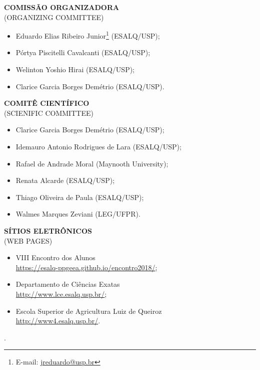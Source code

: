 \documentclass[12pt, twoside, a4paper]{article}
\newcommand{\blankpage}{
  \begin{titlepage}\centering . \end{titlepage}
}
\begin{document}
\begin{titlepage}
  \noindent
  \textbf{COMISSÃO ORGANIZADORA}\\
  (ORGANIZING COMMITTEE)
  \begin{itemize}
    \item Eduardo Elias Ribeiro Junior\footnote{E-mail:
        \url{jreduardo@usp.br}} (ESALQ/USP);
    \item Pórtya Piscitelli Cavalcanti (ESALQ/USP);
    \item Welinton Yoshio Hirai (ESALQ/USP);
    \item Clarice Garcia Borges Demétrio (ESALQ/USP).
  \end{itemize}
  \vspace{1cm}
  \noindent
  \textbf{COMITÊ CIENTÍFICO}\\
  (SCIENIFIC COMMITTEE)
  \begin{itemize}
    \item Clarice Garcia Borges Demétrio (ESALQ/USP);
    \item Idemauro Antonio Rodrigues de Lara (ESALQ/USP);
    \item Rafael de Andrade Moral (Maynooth University);
    \item Renata Alcarde (ESALQ/USP);
    \item Thiago Oliveira de Paula (ESALQ/USP);
    \item Walmes Marques Zeviani (LEG/UFPR).
  \end{itemize}
  \vspace{1cm}
  \noindent
  \textbf{SÍTIOS ELETRÔNICOS}\\
  (WEB PAGES)
  \begin{itemize}
    \item VIII Encontro dos Alunos\\
      \url{https://esalq-ppgeea.github.io/encontro2018/};
    \item Departamento de Ciências Exatas\\
      \url{http://www.lce.esalq.usp.br/};
    \item Escola Superior de Agricultura Luiz de Queiroz\\
      \url{http://www4.esalq.usp.br/}.
  \end{itemize}
  \vspace{1cm}
\end{titlepage}
\blankpage
\end{document}
